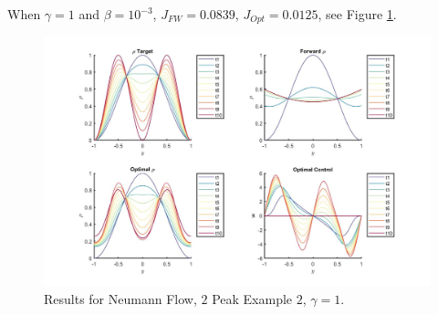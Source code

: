 \documentclass[11pt, a4paper]{article}
\theoremstyle{definition}
\begin{document}
When $\gamma = 1$ and $\beta = 10^{-3}$, $J_{FW} = 0.0839$, $J_{Opt} = 0.0125$, see Figure \ref{Ex12Peak2b}.
\begin{figure}[h]
	\includegraphics[scale=0.3]{Res2Peak2b.jpg}
	\caption{Results for Neumann Flow, $2$ Peak Example $2$, $\gamma = 1$.}
	\label{Ex12Peak2b}
\end{figure}
\end{document}
